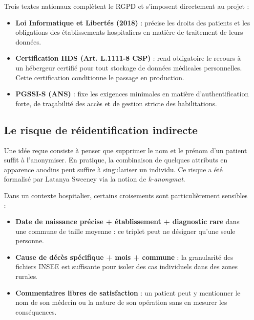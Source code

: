 \documentclass[12pt, a4paper]{report}
\begin{document}
\begin{itemize}[label=\textcolor{chuBlue}{\textbullet}]
Trois textes nationaux complètent le RGPD et s'imposent directement au projet :

\begin{itemize}[label=\textcolor{chuBlue}{\textbullet}]
  \item \textbf{Loi Informatique et Libertés (2018)} : précise les droits des patients et les obligations des établissements hospitaliers en matière de traitement de leurs données.
  \item \textbf{Certification HDS (Art. L.1111-8 CSP)} : rend obligatoire le recours à un hébergeur certifié pour tout stockage de données médicales personnelles. Cette certification conditionne le passage en production.
  \item \textbf{PGSSI-S (ANS)} : fixe les exigences minimales en matière d'authentification forte, de traçabilité des accès et de gestion stricte des habilitations.
\end{itemize}

\subsection{Le risque de réidentification indirecte}

Une idée reçue consiste à penser que supprimer le nom et le prénom d'un patient suffit à l'anonymiser. En pratique, la combinaison de quelques attributs en apparence anodins peut suffire à singulariser un individu. Ce risque a été formalisé par Latanya Sweeney via la notion de \emph{k-anonymat}.

Dans un contexte hospitalier, certains croisements sont particulièrement sensibles :

\begin{itemize}[label=\textcolor{chuBlue}{\textbullet}]
  \item \textbf{Date de naissance précise + établissement + diagnostic rare} dans une commune de taille moyenne : ce triplet peut ne désigner qu'une seule personne.
  \item \textbf{Cause de décès spécifique + mois + commune} : la granularité des fichiers INSEE est suffisante pour isoler des cas individuels dans des zones rurales.
  \item \textbf{Commentaires libres de satisfaction} : un patient peut y mentionner le nom de son médecin ou la nature de son opération sans en mesurer les conséquences.
\end{itemize}


\end{itemize}
\end{document}
